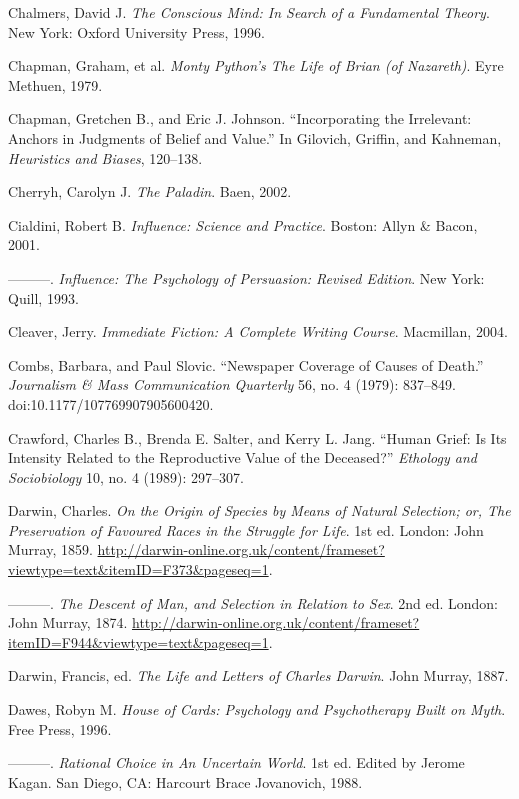 {
 Chalmers, David J. \textit{The Conscious Mind: In Search of a
Fundamental Theory}. New York: Oxford University Press, 1996.}

{
 Chapman, Graham, et al. \textit{Monty Python's The
Life of Brian (of Nazareth)}. Eyre Methuen, 1979.}

{
 Chapman, Gretchen B., and Eric J. Johnson.
``Incorporating the Irrelevant: Anchors in Judgments
of Belief and Value.'' In Gilovich, Griffin, and
Kahneman, \textit{Heuristics and Biases}, 120--138.}

{
 Cherryh, Carolyn J. \textit{The Paladin}. Baen, 2002.}

{
 Cialdini, Robert B. \textit{Influence: Science and Practice}.
Boston: Allyn \& Bacon, 2001.}

{
 {}---{}---{}---. \textit{Influence: The Psychology of Persuasion:
Revised Edition}. New York: Quill, 1993.}

{
 Cleaver, Jerry. \textit{Immediate Fiction: A Complete Writing
Course}. Macmillan, 2004.}

{
 Combs, Barbara, and Paul Slovic. ``Newspaper
Coverage of Causes of Death.'' \textit{Journalism \&
Mass Communication Quarterly} 56, no. 4 (1979): 837--849.
doi:10.1177/107769907905600420.}

{
 Crawford, Charles B., Brenda E. Salter, and Kerry L. Jang.
``Human Grief: Is Its Intensity Related to the
Reproductive Value of the Deceased?''
\textit{Ethology and Sociobiology} 10, no. 4 (1989): 297--307.}

{
 Darwin, Charles. \textit{On the Origin of Species by Means of
Natural Selection; or, The Preservation of Favoured Races in the
Struggle for Life}. 1st ed. London: John Murray, 1859.
\url{http://darwin-online.org.uk/content/frameset?viewtype=text\&itemID=F373\&pageseq=1}.}

{
 {}---{}---{}---. \textit{The Descent of Man, and Selection in
Relation to Sex}. 2nd ed. London: John Murray, 1874.
\url{http://darwin-online.org.uk/content/frameset?itemID=F944\&viewtype=text\&pageseq=1}.}

{
 Darwin, Francis, ed. \textit{The Life and Letters of Charles
Darwin}. John Murray, 1887.}

{
 Dawes, Robyn M. \textit{House of Cards: Psychology and
Psychotherapy Built on Myth}. Free Press, 1996.}

{
 {}---{}---{}---. \textit{Rational Choice in An Uncertain World}.
1st ed. Edited by Jerome Kagan. San Diego, CA: Harcourt Brace
Jovanovich, 1988.}

